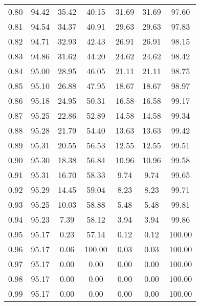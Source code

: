 \begin{tabular}{|c|c|c|c|c|c|c|}
      0.80 &     94.42 &     35.42 &      40.15 &   31.69 &      31.69 &         97.60 \\
      0.81 &     94.54 &     34.37 &      40.91 &   29.63 &      29.63 &         97.83 \\
      0.82 &     94.71 &     32.93 &      42.43 &   26.91 &      26.91 &         98.15 \\
      0.83 &     94.86 &     31.62 &      44.20 &   24.62 &      24.62 &         98.42 \\
      0.84 &     95.00 &     28.95 &      46.05 &   21.11 &      21.11 &         98.75 \\
      0.85 &     95.10 &     26.88 &      47.95 &   18.67 &      18.67 &         98.97 \\
      0.86 &     95.18 &     24.95 &      50.31 &   16.58 &      16.58 &         99.17 \\
      0.87 &     95.25 &     22.86 &      52.89 &   14.58 &      14.58 &         99.34 \\
      0.88 &     95.28 &     21.79 &      54.40 &   13.63 &      13.63 &         99.42 \\
      0.89 &     95.31 &     20.55 &      56.53 &   12.55 &      12.55 &         99.51 \\
      0.90 &     95.30 &     18.38 &      56.84 &   10.96 &      10.96 &         99.58 \\
      0.91 &     95.31 &     16.70 &      58.33 &    9.74 &       9.74 &         99.65 \\
      0.92 &     95.29 &     14.45 &      59.04 &    8.23 &       8.23 &         99.71 \\
      0.93 &     95.25 &     10.03 &      58.88 &    5.48 &       5.48 &         99.81 \\
      0.94 &     95.23 &      7.39 &      58.12 &    3.94 &       3.94 &         99.86 \\
      0.95 &     95.17 &      0.23 &      57.14 &    0.12 &       0.12 &        100.00 \\
      0.96 &     95.17 &      0.06 &     100.00 &    0.03 &       0.03 &        100.00 \\
      0.97 &     95.17 &      0.00 &       0.00 &    0.00 &       0.00 &        100.00 \\
      0.98 &     95.17 &      0.00 &       0.00 &    0.00 &       0.00 &        100.00 \\
      0.99 &     95.17 &      0.00 &       0.00 &    0.00 &       0.00 &        100.00 \\
\bottomrule
\end{tabular}
